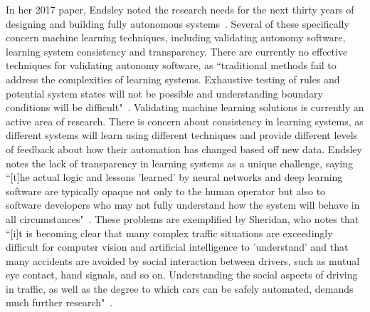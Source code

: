 In her 2017 paper, Endsley noted the research needs for the next thirty years of designing and building fully autonomous systems~\citep{endsley_here_2017}.
Several of these specifically concern machine learning techniques, including validating autonomy software, learning system consistency and transparency.
There are currently no effective techniques for validating autonomy software, as ``traditional methods fail to address the complexities of learning systems.
Exhaustive testing of rules and potential system states will not be possible and understanding boundary conditions will be difficult"~\citep{endsley_here_2017}.
Validating machine learning solutions is currently an active area of research.
There is concern about consistency in learning systems, as different systems will learn using different techniques and provide different levels of feedback about how their automation has changed based off new data.
Endsley notes the lack of transparency in learning systems as a unique challenge, saying ``[t]he actual logic and lessons 'learned' by neural networks and deep learning software are typically opaque not only to the human operator but also to software developers who may not fully understand how the system will behave in all circumstances"~\citep{endsley_here_2017}.
These problems are exemplified by Sheridan, who notes that ``[i]t is becoming clear that many complex traffic situations are exceedingly difficult for computer vision and artificial intelligence to 'understand' and that many accidents are avoided by social interaction between drivers, such as mutual eye contact, hand signals, and so on.
Understanding the social aspects of driving in traffic, as well as the degree to which cars can be safely automated, demands much further research"~\citep{sheridan_humanrobot_2016}.

